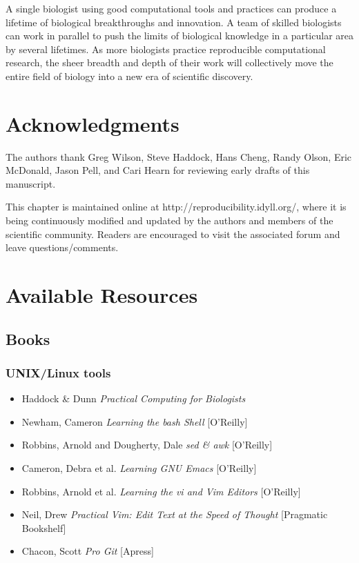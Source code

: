 \documentclass[ChapterTOCs,krantz2]{krantz} %
\newcommand{\unix}{UNIX}
\begin{document}
A single biologist using good computational tools and
practices can produce a lifetime of biological breakthroughs and innovation.  A
team of skilled biologists can work in parallel to push the
limits of biological knowledge in a particular area by several lifetimes.  As
more biologists practice reproducible computational research, the sheer breadth
and depth of their work will collectively move the entire field of biology into
a new era of scientific discovery.

\section{Acknowledgments}

The authors thank Greg Wilson, Steve Haddock, Hans Cheng, Randy Olson, 
Eric McDonald, Jason Pell, and Cari Hearn for reviewing early drafts of
this manuscript.

This chapter is maintained online at
http://reproducibility.idyll.org/, where it is being continuously
modified and updated by the authors and members of the scientific
community.  Readers are encouraged to visit the associated forum and
leave questions/comments.


\section{Available Resources}
\subsection{Books}
\subsubsection{\unix{}/Linux tools}
\begin{itemize}
\item Haddock \& Dunn \emph{Practical Computing for Biologists}
\item Newham, Cameron \emph{Learning the bash Shell} [O'Reilly]
\item Robbins, Arnold and Dougherty, Dale \emph{sed \& awk} [O'Reilly]
\item Cameron, Debra et al. \emph{Learning GNU Emacs} [O'Reilly]
\item Robbins, Arnold et al. \emph{Learning the vi and Vim Editors} [O'Reilly]
\item Neil, Drew \emph{Practical Vim: Edit Text at the Speed of Thought} [Pragmatic Bookshelf]
\item Chacon, Scott \emph{Pro Git} [Apress]
\end{itemize}
\end{document}
